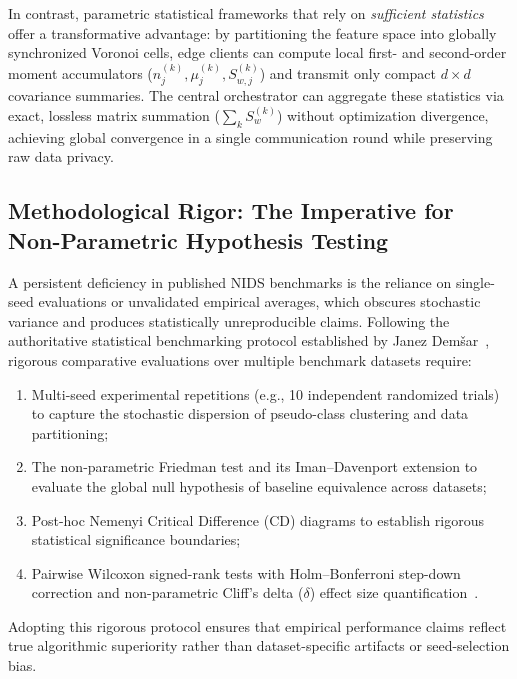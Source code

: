 In contrast, parametric statistical frameworks that rely on \emph{sufficient statistics} offer a transformative advantage: by partitioning the feature space into globally synchronized Voronoi cells, edge clients can compute local first- and second-order moment accumulators ($n_j^{(k)}, \mu_j^{(k)}, S_{w,j}^{(k)}$) and transmit only compact $d \times d$ covariance summaries. The central orchestrator can aggregate these statistics via exact, lossless matrix summation ($\sum_k S_{w}^{(k)}$) without optimization divergence, achieving global convergence in a single communication round while preserving raw data privacy.

\subsection{Methodological Rigor: The Imperative for Non-Parametric Hypothesis Testing}
\label{subsec:rel_demser_rigor}

A persistent deficiency in published NIDS benchmarks is the reliance on single-seed evaluations or unvalidated empirical averages, which obscures stochastic variance and produces statistically unreproducible claims. Following the authoritative statistical benchmarking protocol established by Janez Dem{\v{s}}ar~\cite{demsar2006statistical}, rigorous comparative evaluations over multiple benchmark datasets require:
\begin{enumerate}
    \item Multi-seed experimental repetitions (e.g., 10 independent randomized trials) to capture the stochastic dispersion of pseudo-class clustering and data partitioning;
    \item The non-parametric Friedman test and its Iman--Davenport extension to evaluate the global null hypothesis of baseline equivalence across datasets;
    \item Post-hoc Nemenyi Critical Difference (CD) diagrams to establish rigorous statistical significance boundaries;
    \item Pairwise Wilcoxon signed-rank tests with Holm--Bonferroni step-down correction and non-parametric Cliff's delta ($\delta$) effect size quantification~\cite{romano2006appropriate}.
\end{enumerate}
Adopting this rigorous protocol ensures that empirical performance claims reflect true algorithmic superiority rather than dataset-specific artifacts or seed-selection bias.
